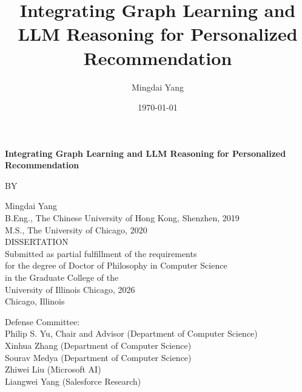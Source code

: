 \documentclass[12pt,reqno,oneside]{amsbook}
\theoremstyle{definition}
\begin{document}
\newcommand{\thetitle}{Integrating Graph Learning and LLM Reasoning for Personalized Recommendation}

\newcommand{\institution}{University of Illinois Chicago} 
\newcommand{\degree}{Doctor of Philosophy}
\newcommand{\programname}{Computer Science}
\newcommand{\committee}{Philip S. Yu, Chair and Advisor (Department of Computer Science)
\\ Xinhua Zhang (Department of Computer Science) 
\\ Sourav Medya (Department of Computer Science)
\\ Zhiwei Liu (Microsoft AI)
\\ Liangwei Yang (Salesforce Research)}
\newcommand{\theauthor}{Mingdai Yang}
\newcommand{\priordegrees}{B.Eng., The Chinese University of Hong Kong, Shenzhen, 2019\\ M.S., The University of Chicago, 2020}
\newcommand{\graduationyear}{2026}

\newcommand{\cmark}{\ding{51}}
\newcommand{\xmark}{\ding{55}}
\author{\theauthor}
\title{\thetitle}
\date{\today}

\frontmatter

\begin{titlepage}
    \centering
	{{\Large {\textbf{\thetitle}}}  \par}
    \vspace{2cm}
    {BY\par}
    \vspace{0.5cm}
    {\theauthor}\\
    {\priordegrees}\\
    \vspace{2cm}
	DISSERTATION\\
	\vspace{1cm}
	Submitted as partial fulfillment of the requirements\\ \vspace{0.2cm}
	for the degree of {\degree} in {\programname} \\ \vspace{0.2cm}
	in the Graduate College of the \\  \vspace{0.2cm}
	University of Illinois Chicago, {\graduationyear}\\
	\vspace{1cm}
	Chicago, Illinois
		
	\raggedright
    \vfill
    Defense Committee: \\
    \committee \\
\end{titlepage}
\end{document}
